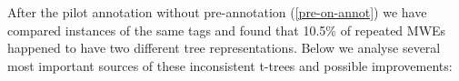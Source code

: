 
After the pilot annotation without pre-annotation (\ref{pre-on-annot})  we have compared instances of the same tags and found that 10.5\% of repeated MWEs happened to have two different tree representations. Below we analyse several most important sources of these inconsistent t-trees and possible improvements:
